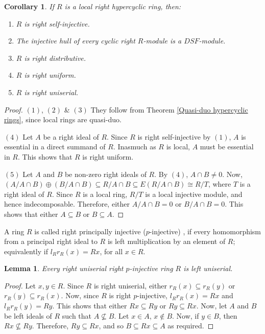 \documentclass{amsart}
\theoremstyle{plain}
\newtheorem{corollary}[theorem]{Corollary}
\newtheorem{lemma}[theorem]{Lemma}
\numberwithin{equation}{section}
\begin{document}
\begin{corollary}
\label{Properties of local hypercyclic rings I}
If $R$ is a local right hypercyclic ring, then: 


\begin{enumerate}
\item $R$ is right self-injective. 

\item The injective hull of every cyclic right $R$-module is a $D S F$-module. 

\item $R$ is right distributive. 

\item $R$ is right uniform. 

\item $R$ is right uniserial. \end{enumerate}
\end{corollary}


\begin{proof}
$(1)$, $(2)$ \& $(3)$ They follow from Theorem \ref{Quasi-duo hypercyclic rings}, since local rings
are quasi-duo. 

$(4)$ Let $A$ be a right ideal of $R$. Since $R$ is right self-injective by $(1)$, $A$ is essential in a direct summand of $R$. Inasmuch as $R$ is local, $A$ must be essential in $R$. This shows that $R$ is right uniform. 

$(5)$ Let $A$ and $B$ be non-zero right ideals of $R$. By $(4)$, $A \cap B \neq 0$. Now, $(A/A \cap B) \oplus (B/A \cap B) \subseteq R/A \cap B \subseteq E (R/A \cap B) \cong R/T$, where $T$ is a right ideal of $R$. Since $R$ is a local ring, $R/T$ is a local injective module, and hence indecomposable. Therefore, either $A/A \cap B =0$ or $B/A \cap B =0$. This shows that either $A \subseteq B$ or $B \subseteq A$. 
\end{proof}

A ring $R$ is called right principally injective ($p$-injective) \cite{NY1}, if every homomorphism from a
principal right ideal to $R$ is left multiplication by an element of $R$; equivalently if $l_{R} r_{R} (x) =R x$, for all $x \in R$. 


\begin{lemma}
\label{Right uniserial right p-injective rings are left uniserial}
Every right uniserial right $p$-injective ring $R$ is left uniserial. 
\end{lemma}


\begin{proof}
Let $x ,y \in R$. Since $R$ is right uniserial, either $r_{R} (x) \subseteq r_{R} (y)$ or $r_{R} (y) \subseteq r_{R} (x)$. Now, since $R$ is right $p$-injective, $l_{R} r_{R} (x) =R x$ and $l_{R} r_{R} (y) =R y$. This shows that either $R x \subseteq R y$ or $R y \subseteq R x$. Now, let $A$ and $B$ be left ideals of $R$ such that $A \nsubseteq B$. Let $x \in A$, $x \notin B$. Now, if $y \in B$, then $R x \nsubseteq R y$. Therefore, $R y \subseteq R x$, and so $B \subseteq R x \subseteq A$ as required. 
\end{proof}
\end{document}
